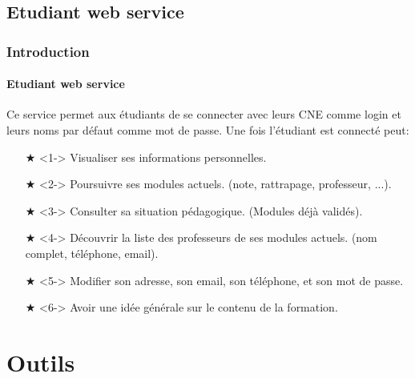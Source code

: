 \subsection{Etudiant web service}
\begin{frame}
\frametitle{Introduction}
\framesubtitle{Etudiant web service}
\transsplithorizontalout[duration=1]

Ce service permet aux étudiants de se connecter  avec leurs CNE comme login et leurs noms par défaut comme mot de passe. Une fois l'étudiant est connecté peut:
\begin{itemize}
\item[\textcolor{colname}{$\bigstar$}]<1-> Visualiser ses informations personnelles.
\item[\textcolor{colname}{$\bigstar$}]<2-> Poursuivre ses modules actuels. (note, rattrapage, professeur, ...).
\item[\textcolor{colname}{$\bigstar$}]<3-> Consulter sa situation pédagogique. (Modules déjà validés).
\item[\textcolor{colname}{$\bigstar$}]<4-> Découvrir la liste des professeurs de ses modules actuels. (nom complet, téléphone, email).
\item[\textcolor{colname}{$\bigstar$}]<5-> Modifier son adresse, son email, son téléphone, et son mot de passe.
\item[\textcolor{colname}{$\bigstar$}]<6-> Avoir une idée générale sur le contenu de la formation. 
\end{itemize}

\end{frame}

\section{Outils}
